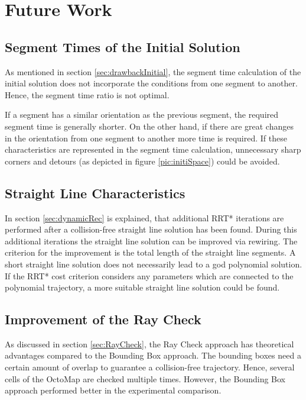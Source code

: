 \chapter{Future Work}\label{chap:Future}

\section{Segment Times of the Initial Solution}
As mentioned in section \ref{sec:drawbackInitial}, the segment time calculation of the initial solution does not incorporate the conditions from one segment to another. Hence, the segment time ratio is not optimal. \newline

If a segment has a similar orientation as the previous segment, the required segment time is generally shorter. On the other hand, if there are great changes in the orientation from one segment to another more time is required. If these characteristics are represented in the segment time calculation, unnecessary sharp corners and detours (as depicted in figure \ref{pic:initiSpace}) could be avoided.

\section{Straight Line Characteristics}

In section \ref{sec:dynamicRec} is explained, that additional RRT* iterations are performed after a collision-free straight line solution has been found. During this additional iterations the straight line solution can be improved via rewiring. The criterion for the improvement is the total length of the straight line segments. \newline
A short straight line solution does not necessarily lead to a god polynomial solution. If the RRT* cost criterion considers any parameters which are connected to the polynomial trajectory, a more suitable straight line solution could be found.

\section{Improvement of the Ray Check}\label{sec:furureRayCheck}

As discussed in section \ref{sec:RayCheck}, the Ray Check approach has theoretical advantages compared to the Bounding Box approach. The bounding boxes need a certain amount of overlap to guarantee a collision-free trajectory. Hence, several cells of the OctoMap are checked multiple times. However, the Bounding Box approach performed better in the experimental comparison. \newline

